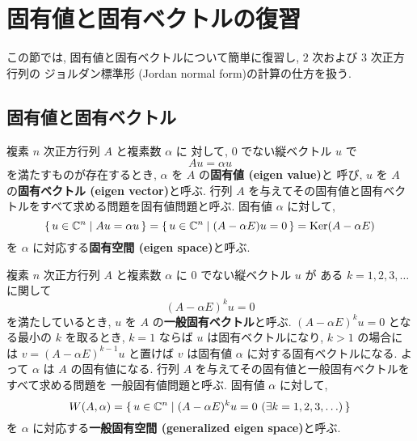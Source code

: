 \documentclass[12pt,twoside]{jarticle}
\begin{document}

\section{固有値と固有ベクトルの復習}

この節では, 固有値と固有ベクトルについて簡単に復習し, 
$2$ 次および $3$ 次正方行列の
ジョルダン標準形 (Jordan normal form)の計算の仕方を扱う.


\subsection{固有値と固有ベクトル}

複素 $n$ 次正方行列 $A$ と複素数 $\alpha$ に
対して, $0$ でない縦ベクトル $u$ で
\begin{equation*}
  A u = \alpha u
\end{equation*}
を満たすものが存在するとき,  $\alpha$ を $A$ の{\bf 固有値 (eigen value)}と
呼び, $u$ を $A$ の{\bf 固有ベクトル (eigen vector)}と呼ぶ.
行列 $A$ を与えてその固有値と固有ベクトルをすべて求める問題を固有値問題と呼ぶ.
固有値 $\alpha$ に対して,
\begin{equation*}
  \{\, u\in{\mathbb C}^n \mid Au = \alpha u \,\}
  = \{\, u\in{\mathbb C}^n \mid (A-\alpha E)u = 0 \,\}
  = \mathop{\mathrm{Ker}}\nolimits(A - \alpha E)
\end{equation*}
を $\alpha$ に対応する{\bf 固有空間 (eigen space)}と呼ぶ.

複素 $n$ 次正方行列 $A$ と複素数 $\alpha$ に $0$ でない縦ベクトル $u$ が
ある $k=1,2,3,\ldots$ に関して
\begin{equation*}
  (A - \alpha E)^k u = 0
\end{equation*}
を満たしているとき, $u$ を $A$ の{\bf 一般固有ベクトル}と呼ぶ.
$(A - \alpha E)^k u = 0$ となる最小の $k$ を取るとき,
$k=1$ ならば $u$ は固有ベクトルになり,
$k>1$ の場合には $v = (A - \alpha E)^{k-1}u$ と置けば $v$ は固有値 $\alpha$ 
に対する固有ベクトルになる.  よって $\alpha$ は $A$ の固有値になる. 
行列 $A$ を与えてその固有値と一般固有ベクトルをすべて求める問題を
一般固有値問題と呼ぶ.  固有値 $\alpha$ に対して, 
\begin{equation*}
  W(A,\alpha) 
  = \{\, u\in{\mathbb C}^n \mid (A - \alpha E)^k u = 0 \ (\exists k = 1,2,3,\ldots)\,\}
\end{equation*}
を $\alpha$ に対応する{\bf 一般固有空間 (generalized eigen space)}と呼ぶ.
\end{document}
